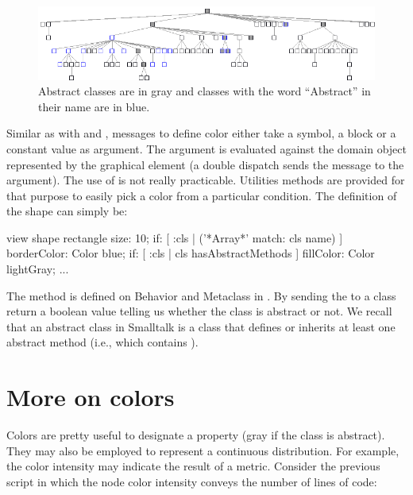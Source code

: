 \documentclass[a4paper,10pt,twoside]{book}
\begin{document}
\begin{figure}[htbp]
\centerline{\includegraphics[width=\linewidth]{arrayClasses}}
\caption{Abstract classes are in gray and classes with the word ``Abstract'' in their name are in blue.}
\label{fig:abstractClasses}
\end{figure}

Similar as with  and , messages to define color either take a symbol, a block or a constant value as argument. The argument is evaluated against the domain object represented by the graphical element (a double dispatch sends the message  to the argument). 
The use of  is not really practicable. Utilities methods are provided for that purpose to easily pick a color from a particular condition. The definition of the shape can simply be:

\begin{code}{}
view shape rectangle
	size: 10;
	if: [ :cls | ('*Array*' match: cls name) ] borderColor: Color blue;
	if: [ :cls | cls hasAbstractMethods ] fillColor: Color lightGray;
...
\end{code}

The method  is defined on Behavior and Metaclass in \pharo. By sending the  to a class return a boolean value telling us whether the class is abstract or not. We recall that an abstract class in Smalltalk is a class that defines or inherits at least one  abstract method (i.e., which contains ).



\section{More on colors}

Colors are pretty useful to designate a property (\eg gray if the class is abstract). They may also be employed to represent a continuous distribution. For example, the color intensity may indicate the result of a metric. Consider the previous script in which the node color intensity conveys the number of lines of code:
\end{document}
